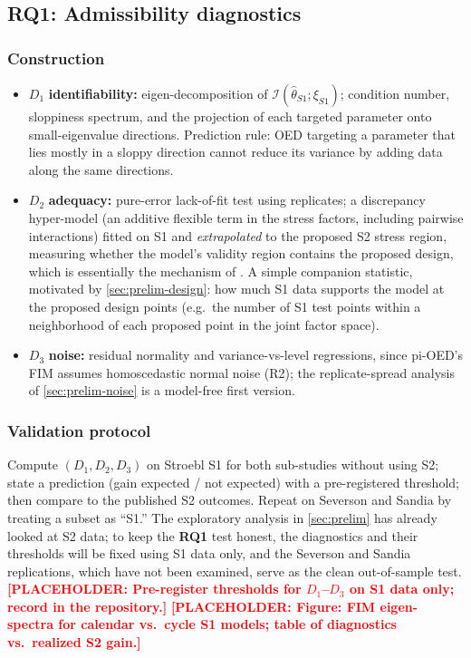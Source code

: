 \documentclass[11pt,letterpaper]{article}
\newcommand{\ph}[1]{\textcolor{red}{\textbf{[PLACEHOLDER: #1]}}}
\newcommand{\RQ}[1]{\textbf{RQ#1}}
\begin{document}
\subsection{\RQ1: Admissibility diagnostics}
\subsubsection{Construction}
\begin{itemize}
  \item $D_1$ \textbf{identifiability:} eigen-decomposition of $\mathcal I(\hat\theta_{S1};\xi_{S1})$; condition number, sloppiness spectrum, and the projection of each targeted parameter onto small-eigenvalue directions. Prediction rule: OED targeting a parameter that lies mostly in a sloppy direction cannot reduce its variance by adding data along the same directions.
  \item $D_2$ \textbf{adequacy:} pure-error lack-of-fit test using replicates; a discrepancy hyper-model (an additive flexible term in the stress factors, including pairwise interactions) fitted on S1 and \emph{extrapolated} to the proposed S2 stress region, measuring whether the model's validity region contains the proposed design, which is essentially the mechanism of \cite{white2016}. A simple companion statistic, motivated by \cref{sec:prelim-design}: how much S1 data supports the model at the proposed design points (e.g.\ the number of S1 test points within a neighborhood of each proposed point in the joint factor space).
  \item $D_3$ \textbf{noise:} residual normality and variance-vs-level regressions, since pi-OED's FIM assumes homoscedastic normal noise (R2); the replicate-spread analysis of \cref{sec:prelim-noise} is a model-free first version.
\end{itemize}
\subsubsection{Validation protocol}
Compute $(D_1,D_2,D_3)$ on Stroebl S1 for both sub-studies without using S2; state a prediction (gain expected / not expected) with a pre-registered threshold; then compare to the published S2 outcomes. Repeat on Severson and Sandia by treating a subset as ``S1.'' The exploratory analysis in \cref{sec:prelim} has already looked at S2 data; to keep the \RQ1 test honest, the diagnostics and their thresholds will be fixed using S1 data only, and the Severson and Sandia replications, which have not been examined, serve as the clean out-of-sample test. \ph{Pre-register thresholds for $D_1$--$D_3$ on S1 data only; record in the repository.} \ph{Figure: FIM eigen-spectra for calendar vs.\ cycle S1 models; table of diagnostics vs.\ realized S2 gain.}
\end{document}
